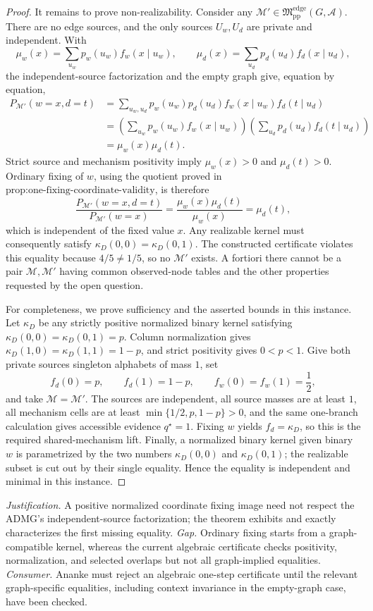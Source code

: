 \documentclass{article}
\begin{document}
\begin{proof}
It remains to prove non-realizability.  Consider any \(\mathcal M'\in\mathfrak M_{\mathrm{pp}}^{\mathrm{edge}}(G,\mathcal A)\).  There are no edge sources, and the only sources \(U_w,U_d\) are private and independent.  With
\[
 \mu_w(x)=\sum_{u_w}p_w(u_w)f_w(x\mid u_w),
 \qquad
 \mu_d(x)=\sum_{u_d}p_d(u_d)f_d(x\mid u_d),
\]
the independent-source factorization and the empty graph give, equation by equation,
\[
\begin{aligned}
P_{\mathcal M'}(w=x,d=t)
&=\sum_{u_w,u_d}p_w(u_w)p_d(u_d)
 f_w(x\mid u_w)f_d(t\mid u_d)\\
&=\left(\sum_{u_w}p_w(u_w)f_w(x\mid u_w)\right)
  \left(\sum_{u_d}p_d(u_d)f_d(t\mid u_d)\right)\\
&=\mu_w(x)\mu_d(t).
\end{aligned}
\]
Strict source and mechanism positivity imply \(\mu_w(x)>0\) and \(\mu_d(t)>0\).  Ordinary fixing of \(w\), using the quotient proved in \(\text{prop:one-fixing-coordinate-validity}\), is therefore
\[
 \frac{P_{\mathcal M'}(w=x,d=t)}{P_{\mathcal M'}(w=x)}
 =\frac{\mu_w(x)\mu_d(t)}{\mu_w(x)}=\mu_d(t),
\]
which is independent of the fixed value \(x\).  Any realizable kernel must consequently satisfy \(\kappa_D(0,0)=\kappa_D(0,1)\).  The constructed certificate violates this equality because \(4/5\ne1/5\), so no \(\mathcal M'\) exists.  A fortiori there cannot be a pair \(\mathcal M,\mathcal M'\) having common observed-node tables and the other properties requested by the open question.

For completeness, we prove sufficiency and the asserted bounds in this instance.  Let \(\kappa_D\) be any strictly positive normalized binary kernel satisfying \(\kappa_D(0,0)=\kappa_D(0,1)=p\).  Column normalization gives \(\kappa_D(1,0)=\kappa_D(1,1)=1-p\), and strict positivity gives \(0<p<1\).  Give both private sources singleton alphabets of mass \(1\), set
\[
 f_d(0)=p,\qquad f_d(1)=1-p,
 \qquad f_w(0)=f_w(1)=\frac12,
\]
and take \(\mathcal M=\mathcal M'\).  The sources are independent, all source masses are at least \(1\), all mechanism cells are at least \(\min\{1/2,p,1-p\}>0\), and the same one-branch calculation gives accessible evidence \(q^{\star}=1\).  Fixing \(w\) yields \(f_d=\kappa_D\), so this is the required shared-mechanism lift.  Finally, a normalized binary kernel given binary \(w\) is parametrized by the two numbers \(\kappa_D(0,0)\) and \(\kappa_D(0,1)\); the realizable subset is cut out by their single equality.  Hence the equality is independent and minimal in this instance.
\end{proof}
\par\smallskip\noindent \textit{Justification.} A positive normalized coordinate fixing image need not respect the ADMG's independent-source factorization; the theorem exhibits and exactly characterizes the first missing equality. \textit{Gap.} Ordinary fixing starts from a graph-compatible kernel, whereas the current algebraic certificate checks positivity, normalization, and selected overlaps but not all graph-implied equalities. \textit{Consumer.} Ananke must reject an algebraic one-step certificate until the relevant graph-specific equalities, including context invariance in the empty-graph case, have been checked.
\end{document}
